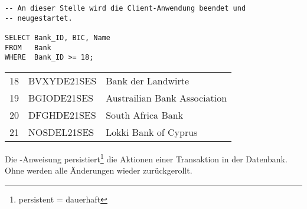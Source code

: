 \begin{lstlisting}[language=oracle_sql,label=sql07_27]
-- An dieser Stelle wird die Client-Anwendung beendet und
-- neugestartet.

SELECT Bank_ID, BIC, Name
FROM   Bank
WHERE  Bank_ID >= 18;
          \end{lstlisting}
\begin{center}
    \begin{small}
        \tablehead{}
        \tabletail {
        }
        \begin{msoraclesql}
            \begin{supertabular}{rll}
                18 & BVXYDE21SES & Bank der Landwirte \\
                19 & BGIODE21SES & Austrailian Bank Association \\
                20 & DFGHDE21SES & South Africa Bank \\
                21 & NOSDEL21SES & Lokki Bank of Cyprus  \\
            \end{supertabular}
        \end{msoraclesql}
    \end{small}
\end{center}
\begin{merke}
    Die \COMMIT-Anweisung persistiert\footnote{persistent = dauerhaft}
    die Aktionen einer Transaktion in der Datenbank. Ohne \COMMIT{} werden alle
    Änderungen wieder zurückgerollt.
\end{merke}
